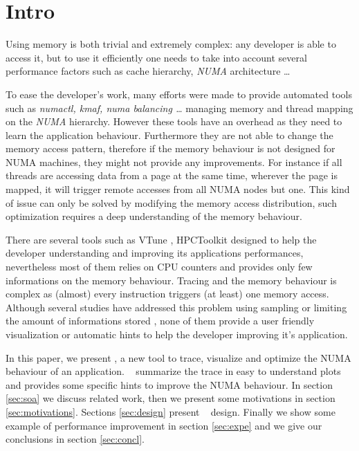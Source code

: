 
\section{Intro}
\label{sec:intro}

Using memory is both trivial and extremely complex: any developer is able to
access it, but to use it efficiently one needs to take into account several
performance factors such as cache hierarchy, \emph{NUMA} architecture
\cite{Drepper07What} \ldots

To ease the developer's work, many efforts were made to provide automated
tools such as \emph{numactl, kmaf, numa balancing \ldots}
managing memory and thread mapping on the \emph{NUMA} hierarchy. However these
tools have an overhead as they need to learn the application behaviour.
Furthermore they are not able to change the memory access pattern, therefore
if the memory behaviour is not designed for NUMA machines, they might not
provide any improvements. For instance if all threads are accessing data from a
page at the same time, wherever the page is mapped, it will trigger remote
accesses from all NUMA nodes but one. This kind of issue can only be solved by
modifying the memory access distribution, such optimization requires a deep
understanding of the memory behaviour.

There are several tools such as VTune \cite{Reinders05VTune},
HPCToolkit\cite{Adhianto10HPCTOOLKIT}  designed to help the
developer understanding and improving its applications performances,
nevertheless most of them relies on CPU counters and provides only few
informations on the memory behaviour. Tracing and the memory behaviour is
complex as (almost) every instruction triggers (at least) one memory access.
Although several studies have addressed this problem using sampling
\cite{Lachaize12MemProf} or limiting the amount of informations stored
, none of them provide a user friendly visualization or automatic hints
to help the developer improving it's application.


In this paper, we present \TABARNAC, a new tool to trace, visualize and
optimize the NUMA behaviour of an application. \TABARNAC~ summarize the trace
in easy to understand plots and provides some specific hints to improve the
NUMA behaviour. In section \ref{sec:soa} we discuss related work, then we
present some motivations in section \ref{sec:motivations}. Sections
\ref{sec:design} present \TABARNAC~ design. Finally we show some example of
performance improvement in section \ref{sec:expe} and we give our conclusions
in section \ref{sec:concl}.
